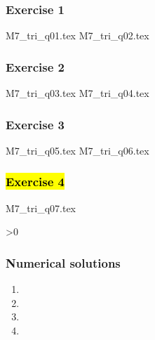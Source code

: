 \begin{questions}

\subsubsection{Exercise 1}
{M7_tri_q01.tex}
{M7_tri_q02.tex}
\newpage

\subsubsection{Exercise 2}
{M7_tri_q03.tex}
{M7_tri_q04.tex}
\newpage

\subsubsection{Exercise 3}
{M7_tri_q05.tex}
{M7_tri_q06.tex}

\newpage
\subsubsection{\hl{Exercise 4}}
{M7_tri_q07.tex}

\ifnum\value{printSols}>0
	\newpage
	\subsubsection*{Numerical solutions}
	\setcounter{solNo}{2}
	\begin{enumerate}
		\item \printSolutionAndInc{} %
		\item \printSolutionAndInc{} %
		\item \printSolutionAndInc{} %
		\item \printSolutionAndInc{} %
	\end{enumerate}
	\else
\fi

\end{questions}